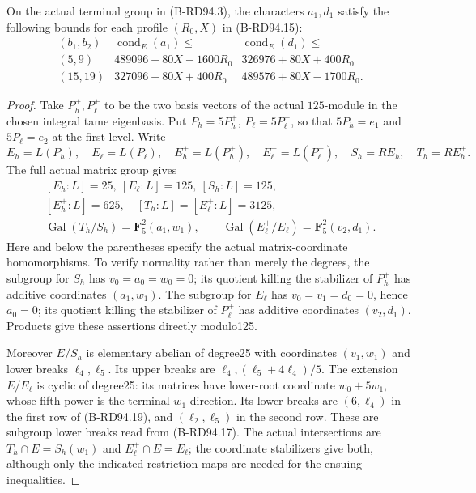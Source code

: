\begin{lemma}
\label{lem:B-RD94-terminal}
On the actual terminal group in (B-RD94.3), the characters
$a_1,d_1$ satisfy the following bounds for each profile
$(R_0,X)$ in (B-RD94.15):
\[
\begin{array}{c|r|r}
 (b_1,b_2)&\operatorname{cond}_E(a_1)\le&
                  \operatorname{cond}_E(d_1)\le\\\hline
 (5,9)&489096+80X-1600R_0&326976+80X+400R_0\\
 (15,19)&327096+80X+400R_0&489576+80X-1700R_0.
\end{array}                                           \tag{B-RD94.19}
\]
\end{lemma}
\begin{proof}
Take $P_h^+,P_\ell^+$ to be the two basis vectors of the actual
$125$-module in the chosen integral tame eigenbasis. Put
$P_h=5P_h^+$, $P_\ell=5P_\ell^+$, so that
$5P_h=e_1$ and $5P_\ell=e_2$ at the first level.
Write
\[
 E_h=L(P_h),\quad E_\ell=L(P_\ell),\quad
 E_h^+=L(P_h^+),\quad E_\ell^+=L(P_\ell^+),\quad
 S_h=RE_h,\quad T_h=RE_h^+.
\]
The full actual matrix group gives
\[
\begin{gathered}
 [E_h:L]=25,\ [E_\ell:L]=125,\ [S_h:L]=125,\\
 [E_h^+:L]=625,\quad[T_h:L]=[E_\ell^+:L]=3125,\\
 \operatorname{Gal}(T_h/S_h)=\mathbf F_5^2(a_1,w_1),\qquad
 \operatorname{Gal}(E_\ell^+/E_\ell)=\mathbf F_5^2(v_2,d_1).
\end{gathered}                                        \tag{B-RD94.20}
\]
Here and below the parentheses specify the actual matrix-coordinate
homomorphisms. To verify normality rather than merely the degrees,
the subgroup for $S_h$ has $v_0=a_0=w_0=0$; its quotient killing
the stabilizer of $P_h^+$ has additive coordinates $(a_1,w_1)$.
The subgroup for $E_\ell$ has $v_0=v_1=d_0=0$, hence $a_0=0$;
its quotient killing the stabilizer of $P_\ell^+$ has additive
coordinates $(v_2,d_1)$. Products give these assertions directly
modulo125.

Moreover $E/S_h$ is elementary abelian of degree25 with coordinates
$(v_1,w_1)$ and lower breaks $\ell_4,\ell_5$. Its upper breaks
are $\ell_4,(\ell_5+4\ell_4)/5$. The extension $E/E_\ell$ is
cyclic of degree25: its matrices have lower-root coordinate
$w_0+5w_1$, whose fifth power is the terminal $w_1$ direction.
Its lower breaks are $(6,\ell_4)$ in the first row of
(B-RD94.19), and $(\ell_2,\ell_5)$ in the second row.
These are subgroup lower breaks read from (B-RD94.17).
The actual intersections are
$T_h\cap E=S_h(w_1)$ and $E_\ell^+\cap E=E_\ell$;
the coordinate stabilizers give both, although only the indicated
restriction maps are needed for the ensuing inequalities.


\end{proof}
